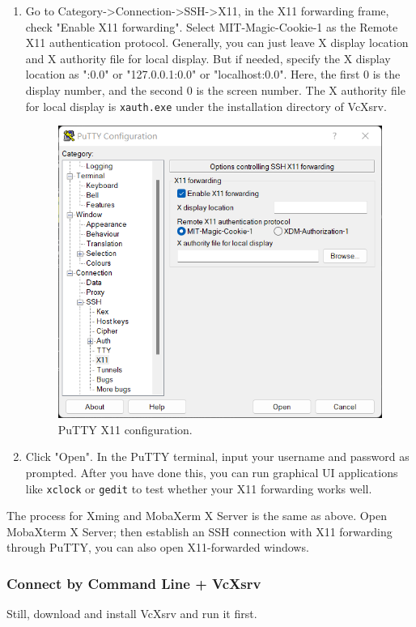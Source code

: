 \documentclass[a4paper,12pt,twoside]{article}
\begin{document}
\begin{enumerate}
    \item Go to Category->Connection->SSH->X11, in the X11 forwarding frame, check "Enable X11 forwarding". Select MIT-Magic-Cookie-1 as the Remote X11 authentication protocol. Generally, you can just leave X display location and X authority file for local display. But if needed, specify the X display location as ":0.0" or "127.0.0.1:0.0" or "localhost:0.0". Here, the first 0 is the display number, and the second 0 is the screen number. The X authority file for local display is \texttt{xauth.exe} under the installation directory of VcXsrv.
    \begin{figure}[H]
        \centering
        \includegraphics[width=\textwidth]{images/5.png}
        \caption{PuTTY X11 configuration.}
    \end{figure}
    \item Click "Open". In the PuTTY terminal, input your username and password as prompted. After you have done this, you can run graphical UI applications like \texttt{xclock} or \texttt{gedit} to test whether your X11 forwarding works well.
\end{enumerate}
The process for Xming and MobaXerm X Server is the same as above. Open MobaXterm X Server; then establish an SSH connection with X11 forwarding through PuTTY, you can also open X11-forwarded windows.
\subsubsection{Connect by Command Line + VcXsrv}\label{S23}
Still, download and install VcXsrv and run it first.
\end{document}
